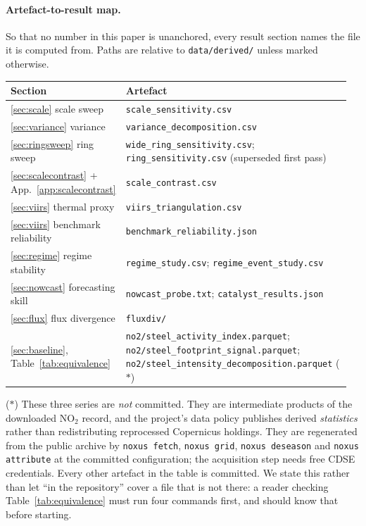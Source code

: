 \documentclass[11pt,a4paper]{article}
\providecommand{\ce}[1]{\ensuremath{\mathrm{#1}}}
\begin{document}
\paragraph{Artefact-to-result map.} So that no number in this paper is unanchored, every result
section names the file it is computed from. Paths are relative to \texttt{data/derived/} unless
marked otherwise.

\smallskip
\noindent\begin{tabular}{@{}p{0.30\linewidth}p{0.66\linewidth}@{}}
\toprule
Section & Artefact \\
\midrule
\ref{sec:scale} scale sweep          & \texttt{scale\_sensitivity.csv} \\
\ref{sec:variance} variance          & \texttt{variance\_decomposition.csv} \\
\ref{sec:ringsweep} ring sweep       & \texttt{wide\_ring\_sensitivity.csv}; \texttt{ring\_sensitivity.csv} (superseded first pass) \\
\ref{sec:scalecontrast} + App.~\ref{app:scalecontrast} & \texttt{scale\_contrast.csv} \\
\ref{sec:viirs} thermal proxy        & \texttt{viirs\_triangulation.csv} \\
\ref{sec:viirs} benchmark reliability & \texttt{benchmark\_reliability.json} \\
\ref{sec:regime} regime stability    & \texttt{regime\_study.csv}; \texttt{regime\_event\_study.csv} \\
\ref{sec:nowcast} forecasting skill  & \texttt{nowcast\_probe.txt}; \texttt{catalyst\_results.json} \\
\ref{sec:flux} flux divergence       & \texttt{fluxdiv/} \\
\ref{sec:baseline}, Table~\ref{tab:equivalence} & \texttt{no2/steel\_activity\_index.parquet};
\texttt{no2/steel\_footprint\_signal.parquet};
\texttt{no2/steel\_intensity\_decomposition.parquet} \; ($\ast$) \\
\bottomrule
\end{tabular}
\smallskip

\noindent ($\ast$) These three series are \emph{not} committed. They are intermediate products of
the downloaded \ce{NO_2} record, and the project's data policy publishes derived \emph{statistics}
rather than redistributing reprocessed Copernicus holdings. They are regenerated from the public
archive by \texttt{noxus fetch}, \texttt{noxus grid}, \texttt{noxus deseason} and
\texttt{noxus attribute} at the committed configuration; the acquisition step needs free CDSE
credentials. Every other artefact in the table is committed. We state this rather than let
``in the repository'' cover a file that is not there: a reader checking
Table~\ref{tab:equivalence} must run four commands first, and should know that before starting.
\end{document}
